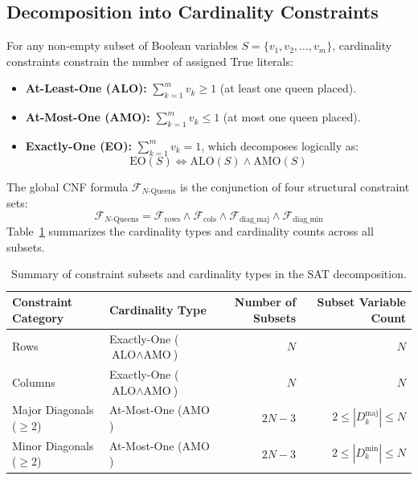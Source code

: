\documentclass[a4paper,fleqn]{cas-sc}
\begin{document}
\subsection{Decomposition into Cardinality Constraints}
\label{subsec:cardinality_decomposition}
For any non-empty subset of Boolean variables $S = \{v_1, v_2, \dots, v_m\}$, cardinality constraints constrain the number of assigned True literals:
\begin{itemize}
    \item \textbf{At-Least-One (ALO):} $\sum_{k=1}^m v_k \ge 1$ (at least one queen placed).
    \item \textbf{At-Most-One (AMO):} $\sum_{k=1}^m v_k \le 1$ (at most one queen placed).
    \item \textbf{Exactly-One (EO):} $\sum_{k=1}^m v_k = 1$, which decomposes logically as:
    \begin{equation}
        \text{EO}(S) \iff \text{ALO}(S) \wedge \text{AMO}(S)
    \end{equation}
\end{itemize}

The global CNF formula $\mathcal{F}_{N\text{-Queens}}$ is the conjunction of four structural constraint sets:
\begin{equation}
    \mathcal{F}_{N\text{-Queens}} = \mathcal{F}_{\text{rows}} \wedge \mathcal{F}_{\text{cols}} \wedge \mathcal{F}_{\text{diag\_maj}} \wedge \mathcal{F}_{\text{diag\_min}}
\end{equation}
Table~\ref{tab:sat_decomposition_summary} summarizes the cardinality types and cardinality counts across all subsets.

\begin{table}[ht]
\centering
\caption{Summary of constraint subsets and cardinality types in the SAT decomposition.}
\label{tab:sat_decomposition_summary}
\begin{tabular}{llrr}
\toprule
\textbf{Constraint Category} & \textbf{Cardinality Type} & \textbf{Number of Subsets} & \textbf{Subset Variable Count} \\
\midrule
Rows & Exactly-One ($\text{ALO} \wedge \text{AMO}$) & $N$ & $N$ \\
Columns & Exactly-One ($\text{ALO} \wedge \text{AMO}$) & $N$ & $N$ \\
Major Diagonals ($\ge 2$) & At-Most-One ($\text{AMO}$) & $2N - 3$ & $2 \le |D_k^{\text{maj}}| \le N$ \\
Minor Diagonals ($\ge 2$) & At-Most-One ($\text{AMO}$) & $2N - 3$ & $2 \le |D_k^{\text{min}}| \le N$ \\
\bottomrule
\end{tabular}
\end{table}
\end{document}
